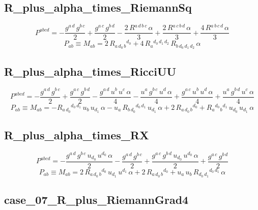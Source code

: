 \documentclass[10pt]{article}
\begin{document}
\subsection*{R\_plus\_alpha\_times\_RiemannSq}
\begin{dmath*}P^{abcd}=-\frac{g{}^{a\,d}\,g{}^{b\,c}}{2} + \frac{g{}^{a\,c}\,g{}^{b\,d}}{2} - \frac{2\,R{}^{a\,d\,b\,c}\,\alpha}{3} + \frac{2\,R{}^{a\,c\,b\,d}\,\alpha}{3} + \frac{4\,R{}^{a\,b\,c\,d}\,\alpha}{3}\end{dmath*}
\begin{dmath*}P_{ab}\equiv M_{ab}=2\,R{}_{a\,d_{0}\,b}{}^{d_{0}} + 4\,R{}_{a}{}^{d_{0}\,d_{1}\,d_{2}}\,R{}_{b\,d_{0}\,d_{1}\,d_{2}}\,\alpha\end{dmath*}
\subsection*{R\_plus\_alpha\_times\_RicciUU}
\begin{dmath*}P^{abcd}=-\frac{g{}^{a\,d}\,g{}^{b\,c}}{2} + \frac{g{}^{a\,c}\,g{}^{b\,d}}{2} - \frac{g{}^{a\,d}\,u{}^{b}\,u{}^{c}\,\alpha}{4} - \frac{u{}^{a}\,g{}^{b\,c}\,u{}^{d}\,\alpha}{4} + \frac{g{}^{a\,c}\,u{}^{b}\,u{}^{d}\,\alpha}{4} + \frac{u{}^{a}\,g{}^{b\,d}\,u{}^{c}\,\alpha}{4}\end{dmath*}
\begin{dmath*}P_{ab}\equiv M_{ab}=-R{}_{a\,d_{0}}{}^{d_{0}\,d_{1}}\,u{}_{b}\,u{}_{d_{1}}\,\alpha - u{}_{a}\,R{}_{b\,d_{0}}{}^{d_{0}\,d_{1}}\,u{}_{d_{1}}\,\alpha + 2\,R{}_{a\,d_{0}\,b}{}^{d_{0}} + R{}_{a}{}^{d_{0}}{}_{b}{}^{d_{1}}\,u{}_{d_{0}}\,u{}_{d_{1}}\,\alpha\end{dmath*}
\subsection*{R\_plus\_alpha\_times\_RX}
\begin{dmath*}P^{abcd}=-\frac{g{}^{a\,d}\,g{}^{b\,c}\,u{}_{d_{0}}\,u{}^{d_{0}}\,\alpha}{2} - \frac{g{}^{a\,d}\,g{}^{b\,c}}{2} + \frac{g{}^{a\,c}\,g{}^{b\,d}\,u{}_{d_{0}}\,u{}^{d_{0}}\,\alpha}{2} + \frac{g{}^{a\,c}\,g{}^{b\,d}}{2}\end{dmath*}
\begin{dmath*}P_{ab}\equiv M_{ab}=2\,R{}_{a\,d_{0}\,b}{}^{d_{0}}\,u{}_{d_{1}}\,u{}^{d_{1}}\,\alpha + 2\,R{}_{a\,d_{0}\,b}{}^{d_{0}} + u{}_{a}\,u{}_{b}\,R{}_{d_{0}\,d_{1}}{}^{d_{0}\,d_{1}}\,\alpha\end{dmath*}
\subsection*{case\_07\_R\_plus\_RiemannGrad4}
\end{document}
